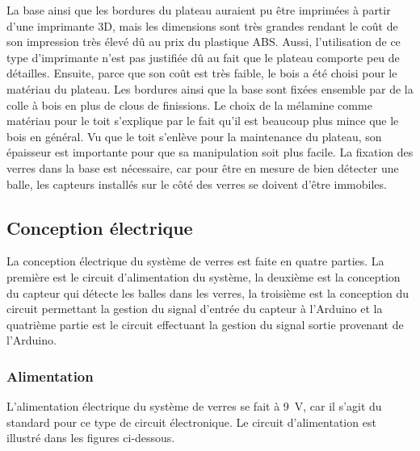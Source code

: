 La base ainsi que les bordures du plateau auraient pu être imprimées à partir d’une imprimante 3D, mais les dimensions sont très grandes rendant le coût de son impression très élevé dû au prix du plastique ABS.
Aussi, l’utilisation de ce type d’imprimante n’est pas justifiée dû au fait que le plateau comporte peu de détailles.
Ensuite, parce que son coût est très faible, le bois a été choisi pour le matériau du plateau.
Les bordures ainsi que la base sont fixées ensemble par de la colle à bois en plus de clous de finissions.
Le choix de la mélamine comme matériau pour le toit s’explique par le fait qu’il est beaucoup plus mince que le bois en général.
Vu que le toit s’enlève pour la maintenance du plateau, son épaisseur est importante pour que sa manipulation soit plus facile.
La fixation des verres dans la base est nécessaire, car pour être en mesure de bien détecter une balle, les capteurs installés sur le côté des verres se doivent d’être immobiles.

\subsection{Conception électrique}

La conception électrique du système de verres est faite en quatre parties.
La première est le circuit d’alimentation du système, la deuxième est la conception du capteur qui détecte les balles dans les verres, la troisième est la conception du circuit permettant la gestion du signal d’entrée du capteur à l'Arduino et la quatrième partie est le circuit effectuant la gestion du signal sortie provenant de l’Arduino.

\subsubsection{Alimentation}

L’alimentation électrique du système de verres se fait à 9~V, car il s’agit du standard pour ce type de circuit électronique.
Le circuit d’alimentation est illustré dans les figures ci-dessous.


